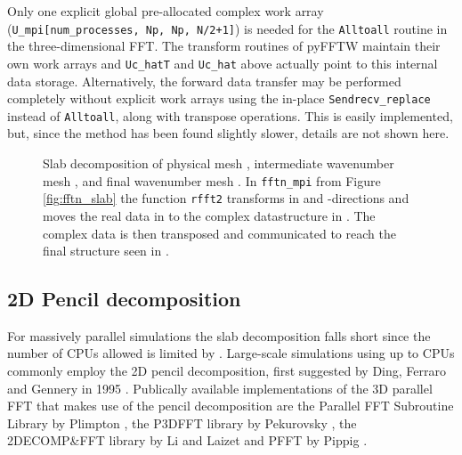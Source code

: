 \documentclass[final,3p,times,twocolumn]{elsarticle}
\newcommand{\inpyth}{\lstinline[style=inlinestyle]}
\begin{document}
Only one explicit global pre-allocated complex work array 
(\inpyth{U_mpi[num_processes, Np, Np, N/2+1]}) is needed for the 
\inpyth{Alltoall} routine in the three-dimensional FFT. The transform routines 
of pyFFTW maintain their own work arrays and \inpyth{Uc_hatT} and 
\inpyth{Uc_hat} above actually point to this internal data storage. 
Alternatively, the forward data transfer may be 
performed completely without explicit work arrays using the in-place 
\inpyth{Sendrecv_replace} instead of \inpyth{Alltoall}, along with transpose 
operations. This is easily implemented, but, since the method has been found 
slightly slower, details are not shown here.

\begin{figure*}[th!]
\centering
{}
\caption{Slab decomposition of physical mesh , intermediate 
wavenumber mesh , and final wavenumber mesh 
. In \inpyth{fftn_mpi} from Figure \ref{fig:fftn_slab} the 
function \inpyth{rfft2} 
transforms in  and -directions and moves the real data in 
 to the complex datastructure in . The 
complex data is then transposed and communicated to reach the final structure 
seen in . }
\label{fig:Slabdecomp}
\end{figure*}

\subsection{2D Pencil decomposition}
\label{pencil2D}

For massively parallel simulations the slab decomposition falls short since the number of CPUs allowed is limited by . Large-scale simulations using up to  CPUs commonly employ the 2D pencil decomposition, first suggested by Ding, Ferraro and Gennery in 1995 \cite{Ding95}. Publically available implementations of the 3D parallel FFT that makes use of the pencil decomposition are the Parallel FFT Subroutine Library by Plimpton \cite{PlimptonFFT}, the P3DFFT library by Pekurovsky \cite{p3dfft, pekurovsky2012}, the 2DECOMP\&FFT library by Li and Laizet \cite{Li2010} and PFFT by Pippig \cite{Pi13}.
\end{document}
